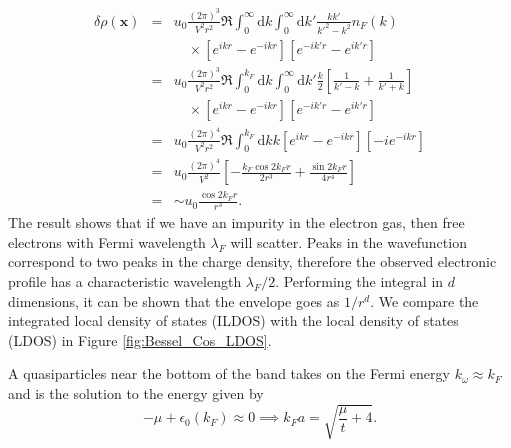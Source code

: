 \begin{eqnarray}
\delta\rho(\mathbf{x}) &=&
u_0 \frac{(2\pi)^3}{V^2 r^2}\Re\int_0^\infty \text{d}k \int_0^\infty \text{d}k'
\frac{ kk'}{k'^2-k^2} n_F(k)
\\
& &\quad\times
\left[e^{ikr} - e^{-ikr}\right]\left[e^{-ik'r}-e^{ik'r}\right]
\\
&=&
u_0 \frac{(2\pi)^3}{V^2r^2}\Re\int_0^{k_F} \text{d}k \int_0^\infty \text{d}k'
\frac{k}{2}\left[\frac{1}{k'-k}+\frac{1}{k'+k}\right]
\\
& &\quad\times
\left[e^{ikr} - e^{-ikr}\right]\left[e^{-ik'r}-e^{ik'r}\right]
\\
&=&
u_0 \frac{(2\pi)^4}{V^2r^2}\Re \int_0^{k_F} \text{d}k k
\left[e^{ikr} - e^{-ikr}\right]
\left[-i e^{-ikr}\right]
\\
&=&
u_0 \frac{(2\pi)^4}{V^2}
\left[
-\frac{k_F\cos{2k_F r}}{2r^3}+\frac{\sin{2k_F r}}{4r^4}
\right]
\\
&=& \sim u_0 \frac{\cos{2k_F r}}{r^3}.
\label{eq:analytical_Friedel}
\end{eqnarray}
The result shows that if we have an impurity in the electron gas, then free electrons with Fermi wavelength $\lambda_F$ will scatter. Peaks in the wavefunction correspond to two peaks in the charge density, therefore the observed electronic profile has a characteristic wavelength $\lambda_F/2$. Performing the integral in $d$ dimensions, it can be shown that the envelope goes as $1/r^d$. We compare the integrated local density of states (ILDOS) with the local density of states (LDOS) in Figure \ref{fig:Bessel_Cos_LDOS}. 

%        

A quasiparticles near the bottom of the band takes on the Fermi energy $k_\omega\approx k_F$ and is the solution to the energy given by
\begin{equation}
-\mu +\epsilon_0(k_F) \approx 0 \implies k_Fa = \sqrt{\frac{\mu}{t}+4}.
\end{equation}

%        


